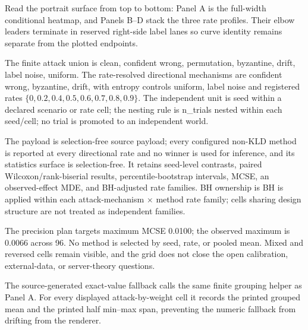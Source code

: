 \documentclass[
  english,
]{article}
\theoremstyle{plain}
\theoremstyle{definition}
\theoremstyle{remark}
\theoremstyle{definition}
\begin{document}
Read the portrait surface from top to bottom: Panel A is the full-width
conditional heatmap, and Panels B--D stack the three rate profiles.
Their elbow leaders terminate in reserved right-side label lanes so
curve identity remains separate from the plotted endpoints.

The finite attack union is clean, confident wrong, permutation,
byzantine, drift, label noise, uniform. The rate-resolved directional
mechanisms are confident wrong, byzantine, drift, with entropy controls
uniform, label noise and registered rates
\(\{0, 0.2, 0.4, 0.5, 0.6, 0.7, 0.8, 0.9\}\). The independent unit is
seed within a declared scenario or rate cell; the nesting rule is
n\_trials nested within each seed/cell; no trial is promoted to an
independent world.

The payload is selection-free source payload; every configured non-KLD
method is reported at every directional rate and no winner is used for
inference, and its statistics surface is selection-free. It retains
seed-level contrasts, paired Wilcoxon/rank-biserial results,
percentile-bootstrap intervals, MCSE, an observed-effect MDE, and
BH-adjusted rate families. BH ownership is BH is applied within each
attack-mechanism \texorpdfstring{\ensuremath{\times}}{x} method rate family; cells sharing design structure
are not treated as independent families.

The precision plan targets maximum MCSE 0.0100; the observed maximum is
0.0066 across 96. No method is selected by seed, rate, or pooled mean.
Mixed and reversed cells remain visible, and the grid does not close the
open calibration, external-data, or server-theory questions.

The source-generated exact-value fallback calls the same finite grouping
helper as Panel A. For every displayed attack-by-weight cell it records
the printed grouped mean and the printed half min--max span, preventing
the numeric fallback from drifting from the renderer.
\end{document}

